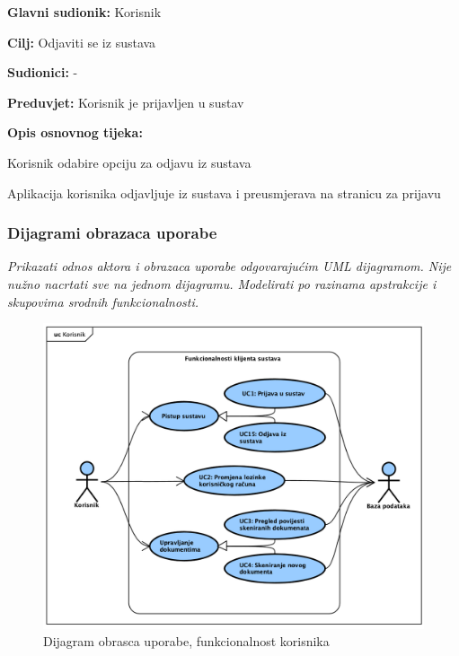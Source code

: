 					\noindent {}
					\begin{packed_item}
	
						\item \textbf{Glavni sudionik:} Korisnik
						\item  \textbf{Cilj:} Odjaviti se iz sustava
						\item  \textbf{Sudionici:} -
						\item  \textbf{Preduvjet:} Korisnik je prijavljen u sustav
						\item  \textbf{Opis osnovnog tijeka:}
						
						\item[] \begin{packed_enum}
	
							\item Korisnik odabire opciju za odjavu iz sustava
							\item Aplikacija korisnika odjavljuje iz sustava i preusmjerava na stranicu za prijavu

						\end{packed_enum}

					\end{packed_item}

				\eject{}
					
				\subsubsection{Dijagrami obrazaca uporabe}
					
					\textit{Prikazati odnos aktora i obrazaca uporabe odgovarajućim UML dijagramom. Nije nužno nacrtati sve na jednom dijagramu. Modelirati po razinama apstrakcije i skupovima srodnih funkcionalnosti.}

					\begin{figure}[H]
						\includegraphics[width=\textwidth]{slike/UseCase_Korisnik.png} %
						\caption{Dijagram obrasca uporabe, funkcionalnost korisnika}
						\label{fig:usecase_korisnik} %
					\end{figure}

